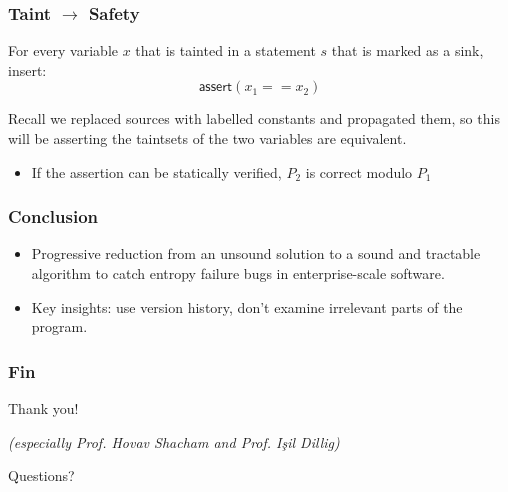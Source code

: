 \documentclass{beamer} %
\theoremstyle{definition} %
\begin{document}
\begin{frame}
\frametitle{Taint $\to$ Safety}
	
	For every variable $x$ that is tainted in a statement $s$ that is marked as a sink, insert: \[\textsf{assert}(x_1 == x_2)\]

    Recall we replaced sources with labelled constants and propagated them, so this will be asserting the taintsets of the two variables are equivalent.
    
    \pause

    \begin{itemize}
        \item If the assertion can be statically verified, $P_2$ is correct modulo $P_1$
    \end{itemize}
	

\end{frame}

\begin{frame}
    \frametitle{Conclusion}

    \begin{itemize}
        \item Progressive reduction from an unsound solution to a sound and tractable algorithm to catch entropy failure bugs in enterprise-scale software.
        \item Key insights: use version history, don't examine irrelevant parts of the program.
    \end{itemize}
\end{frame}

\begin{frame}
    \frametitle{Fin}
    \begin{center}
    Thank you! 

    \emph{\scriptsize{(especially Prof. Hovav Shacham and Prof. Işil Dillig)}}
    
    \LARGE{Questions?}
    
    \end{center}
\end{frame}




\end{document}
